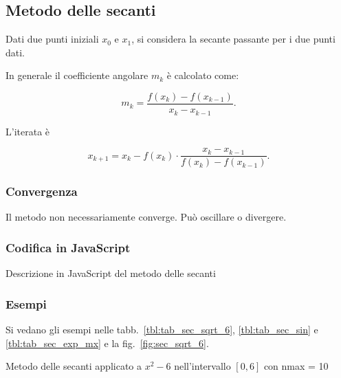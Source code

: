 \subsection{Metodo delle secanti}

Dati due punti iniziali $x_0$ e $x_1$, si considera la secante passante per i due punti dati.

In generale il coefficiente angolare $m_k$ è calcolato come:

$$m_k = \frac{f(x_k) - f(x_{k-1})}{x_k - x_{k-1}}.$$

L'iterata è

$$x_{k+1} = x_k - f(x_k) \cdot \frac{x_k - x_{k-1}}{f(x_k) - f(x_{k-1})}.$$

\subsubsection{Convergenza}

Il metodo non necessariamente converge.
Può oscillare o divergere.

\subsubsection{Codifica in JavaScript}

\begin{lstfloat}
    
    \caption{Descrizione in JavaScript del metodo delle secanti}
    \label{lst:secanti}
\end{lstfloat}

\subsubsection{Esempi}

Si vedano gli esempi nelle tabb.~\ref{tbl:tab_sec_sqrt_6}, \ref{tbl:tab_sec_sin} e \ref{tbl:tab_sec_exp_mx} e la fig.~\ref{fig:sec_sqrt_6}.


\begin{table}
    \begin{center}
\end{center}        
\caption[]{Metodo delle secanti applicato a $x^2 -6$ nell'intervallo $[0, 6]$ con nmax = 10}
\label{tbl:tab_sec_sqrt_6}
\end{table}

